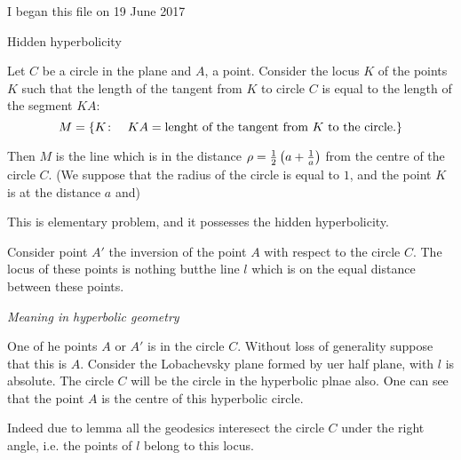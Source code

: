 



\baselineskip=14pt
\def\vare {\varepsilon}
\def\A {{\bf A}}
\def\t {\tilde}
\def\a {\alpha}
\def\K {{\bf K}}
\def\N {{\bf N}}
\def\V {{\cal V}}
\def\s {{\sigma}}
\def\S {{\Sigma}}
\def\s {{\sigma}}
\def\p{\partial}
\def\vare{{\varepsilon}}
\def\Q {{\bf Q}}
\def\D {{\cal D}}
\def\G {{\Gamma}}
\def\C {{\bf C}}
\def\M {{\cal M}}
\def\Z {{\bf Z}}
\def\U  {{\cal U}}
\def\H {{\cal H}}
\def\R  {{\bf R}}
\def\S  {{\bf S}}
\def\E  {{\bf E}}
\def\l {\lambda}
\def\degree {{\bf {\rm degree}\,\,}}
\def \finish {${\,\,\vrule height1mm depth2mm width 8pt}$}
\def \m {\medskip}
\def\p {\partial}
\def\r {{\bf r}}
\def\pt {{\bf pt}}
\def\v {{\bf v}}
\def\n {{\bf n}}
\def\t {{\bf t}}
\def\b {{\bf b}}
\def\c {{\bf c }}
\def\e{{\bf e}}
\def\ac {{\bf a}}
\def \X   {{\bf X}}
\def \Y   {{\bf Y}}
\def \x   {{\bf x}}
\def \y   {{\bf y}}
\def \G{{\cal G}}

 I began this file on 19 June 2017


\centerline {Hidden hyperbolicity}


  Let $C$ be a circle in the plane and $A$, a point. Consider the locus $K$ 
of the points $K$ such that the length of the tangent from $K$ to circle
$C$ is equal to the length of the segment $KA$:
                     $$
   M=\{K\colon\quad KA=\hbox {lenght of the tangent from $K$ to the circle.}\}
                     $$

Then $M$ is the line which is in the distance 
$\rho={1\over 2}\left(a+{1\over a}\right)$ from the centre of the circle $C$.
(We suppose that the radius of the circle is equal to $1$,
and the point $K$ is at the distance $a$ and)


This is elementary problem, and it possesses the hidden hyperbolicity.



 
   Consider point $A'$ the inversion of the point $A$
with respect to the circle $C$.
  The locus of these points is nothing butthe line $l$ which is on the equal
 distance between these points. 

 {\it Meaning in hyperbolic geometry}

One of he points $A$ or $A'$ is in the circle $C$. 
Without loss of generality suppose that this is $A$.
Consider the Lobachevsky plane formed by uer half plane, with
  $l$ is absolute.  
  The circle $C$ will be the circle in the hyperbolic plnae also.
One can see that the point $A$ is the centre
of this hyperbolic circle. 


   Indeed  due to lemma all the geodesics interesect 
the circle $C$ under the right angle, i.e. the points of $l$
belong to this locus.

 
\bye

